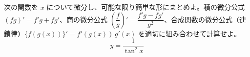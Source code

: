 
次の関数を $x$ について微分し、可能な限り簡単な形にまとめよ。積の微分公式 $(fg)' = f'g + fg'$、商の微分公式 $\left(\dfrac{f}{g}\right)' = \dfrac{f'g - fg'}{g^{2}}$、合成関数の微分公式（連鎖律）$\{f(g(x))\}' = f'(g(x))\,g'(x)$ を適切に組み合わせて計算せよ。
\[
y = \frac{1}{\tan^{2} x}
\]
